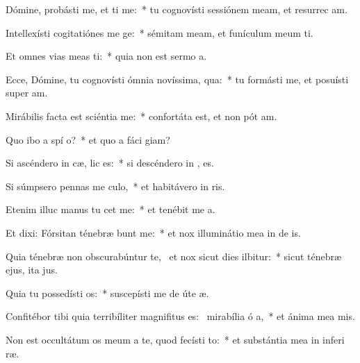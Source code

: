 \item Dómine, probásti me, et ti me:~* tu cognovísti sessiónem meam, et resurrec am.
\item Intellexísti cogitatiónes me  ge:~* sémitam meam, et funículum meum ti.
\item Et omnes vias meas ti:~* quia non est sermo   a.
\item Ecce, Dómine, tu cognovísti ómnia novíssima,  qua:~* tu formásti me, et posuísti super   am.
\item Mirábilis facta est sciéntia   me:~* confortáta est, et non pót  am.
\item Quo ibo a spí o?~* et quo a fáci  giam?
\item Si ascéndero in cæ,  lic es:~* si descéndero in , es.
\item Si súmpsero pennas me culo,~* et habitávero in  ris.
\item Etenim illuc manus tu cet me:~* et tenébit me  a.
\item Et dixi: Fórsitan ténebræ bunt me:~* et nox illuminátio mea in de is.
\item Quia ténebræ non obscurabúntur  te,~\pscross{} et nox sicut dies ilbitur:~* sicut ténebræ ejus, ita   jus.
\item Quia tu possedísti  os:~* suscepísti me de úte  æ.
\item Confitébor tibi quia terribíliter magnifitus es:~\pscross{} mirabília ó a,~* et ánima mea  mis.
\item Non est occultátum os meum a te, quod fecísti  to:~* et substántia mea in inferi ræ.
